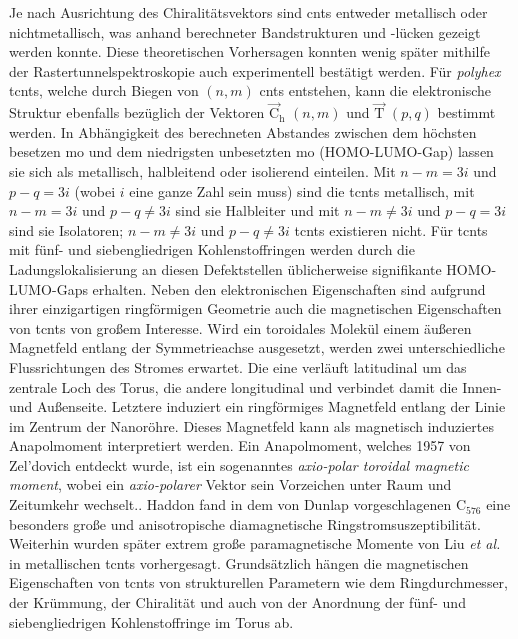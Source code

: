 Je nach Ausrichtung des Chiralitätsvektors sind \acp{cnt} entweder metallisch oder nichtmetallisch, was anhand berechneter Bandstrukturen und -lücken gezeigt werden konnte.\supercite{mintmire1992fullerene,hamada1992new,saito1992electronic,saito1998physical} Diese theoretischen Vorhersagen konnten wenig später mithilfe der Rastertunnelspektroskopie auch experimentell bestätigt werden.\supercite{wilder1998electronic} Für \textit{polyhex} \acp{tcnt}, welche durch Biegen von $(n,m)$ \acp{cnt} entstehen, kann die elektronische Struktur ebenfalls bezüglich der Vektoren $\vec{\text{C}}_\text{h}$ $(n,m)$ und $\vec{\text{T}}$ $(p,q)$ bestimmt werden.\supercite{ceulemans2000electronic} In Abhängigkeit des berechneten Abstandes zwischen dem höchsten besetzen \ac{mo} und dem niedrigsten unbesetzten \ac{mo} (HOMO-LUMO-Gap) lassen sie sich als metallisch, halbleitend oder isolierend einteilen. Mit $n-m=3i$ und $p-q=3i$ (wobei $i$ eine ganze Zahl sein muss) sind die \acp{tcnt} metallisch, mit $n-m=3i$ und $p-q\neq3i$ sind sie Halbleiter und mit $n-m\neq3i$ und $p-q=3i$ sind sie Isolatoren; $n-m\neq3i$ und $p-q\neq3i$ \acp{tcnt} existieren nicht.\supercite{zhang2005electronic} Für \acp{tcnt} mit fünf- und siebengliedrigen Kohlenstoffringen werden durch die Ladungslokalisierung an diesen Defektstellen üblicherweise signifikante HOMO-LUMO-Gaps erhalten.\supercite{meunier1998atomic,oh2000structures,yazgan2004electronic,wu2011density} Neben den elektronischen Eigenschaften sind aufgrund ihrer einzigartigen ringförmigen Geometrie auch die magnetischen Eigenschaften von \acp{tcnt} von großem Interesse. Wird ein toroidales Molekül einem äußeren Magnetfeld entlang der Symmetrieachse ausgesetzt, werden zwei unterschiedliche Flussrichtungen des Stromes erwartet.\supercite{sundholm2016calculations} Die eine verläuft latitudinal um das zentrale Loch des Torus, die andere longitudinal und verbindet damit die Innen- und Außenseite. Letztere induziert ein ringförmiges Magnetfeld entlang der Linie im Zentrum der Nanoröhre. Dieses Magnetfeld kann als magnetisch induziertes Anapolmoment interpretiert werden.\supercite{berger2012prediction,ceulemans1998molecular,pelloni2011magnetic} Ein Anapolmoment, welches 1957 von Zel'dovich\supercite{zel1958electromagnetic} entdeckt wurde, ist ein sogenanntes \textit{axio-polar toroidal magnetic moment}\supercite{ascher1966some}, wobei ein \textit{axio-polarer} Vektor sein Vorzeichen unter Raum und Zeitumkehr wechselt.\supercite{schmid2001ferrotoroidics}. Haddon fand in dem von Dunlap vorgeschlagenen C$_{576}$ eine besonders große und anisotropische diamagnetische Ringstromsuszeptibilität.\supercite{haddon1997electronic} Weiterhin wurden später extrem große paramagnetische Momente von Liu \textit{et al.}\supercite{liu2002colossal} in metallischen \acp{tcnt} vorhergesagt. Grundsätzlich hängen die magnetischen Eigenschaften von \acp{tcnt} von strukturellen Parametern wie dem Ringdurchmesser, der Krümmung, der Chiralität und auch von der Anordnung der fünf- und siebengliedrigen Kohlenstoffringe im Torus ab.\supercite{tsai2004magnetization,liu2007magnetic,liu2008magnetic}\\

